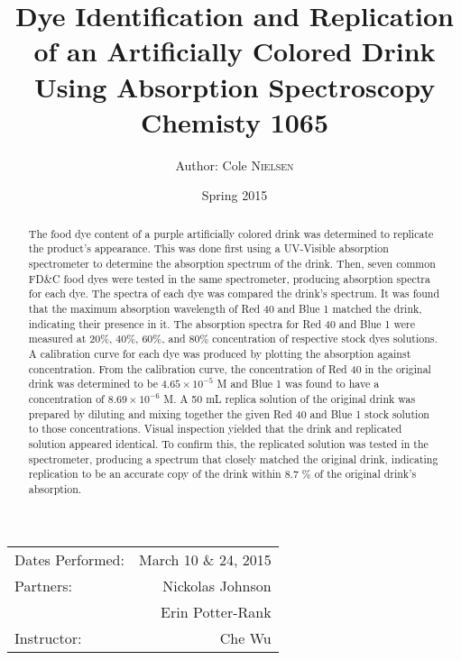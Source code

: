\documentclass[12pt]{article}
\title{Dye Identification and Replication\\of an Artificially Colored Drink\\ Using Absorption Spectroscopy\\ \vspace{0.3 in} Chemisty 1065} %
\author{Author: Cole \textsc{Nielsen}} %
\date{Spring 2015} %
\begin{document}
\maketitle %

\begin{center}
 \begin{tabular}{l r}
  Dates Performed: & March 10 \& 24, 2015 \\ %
  Partners: & Nickolas Johnson \\ %
  & Erin Potter-Rank \\
  Instructor: & Che Wu %
 \end{tabular}
\end{center}

\pagebreak
\begin{abstract}\doublespacing
The food dye content of a purple artificially colored drink was determined to replicate the product's appearance. This was done first using a UV-Visible absorption spectrometer to determine the  absorption spectrum of the drink. Then, seven common FD\&C food dyes were tested in the same spectrometer, producing absorption spectra for each dye. The spectra of each dye was compared the drink's spectrum. It was found that the maximum absorption wavelength of Red 40 and Blue 1 matched the drink, indicating their presence in it. The absorption spectra for Red 40 and Blue 1 were measured at 20\%, 40\%, 60\%, and 80\% concentration of respective stock dyes solutions. A calibration curve for each dye was produced by plotting the absorption against concentration. From the calibration curve, the concentration of Red 40 in the original drink was determined to be $4.65 \times 10^{-5}$ M and Blue 1 was found to have a concentration of $8.69 \times 10^{-6}$ M. A 50 mL replica solution of the original drink was prepared by diluting and mixing together the given Red 40 and Blue 1 stock solution to those concentrations. Visual inspection yielded that the drink and replicated solution appeared identical. To confirm this, the replicated solution was tested in the spectrometer, producing a spectrum that closely matched the original drink, indicating replication to be an accurate copy of the drink within 8.7 \% of the original drink's absorption. 
\end{abstract}
\end{document}
